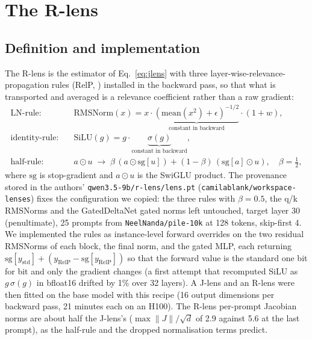 \documentclass[11pt]{article}
\begin{document}
\section{The R-lens}
\label{sec:rlens}
\subsection{Definition and implementation}
The R-lens \cite{blank2026rlens} is the estimator of Eq.~\eqref{eq:jlens} with three layer-wise-relevance-propagation rules (RelP, \cite{relp2025}) installed in the backward pass, so that what is transported and averaged is a relevance coefficient rather than a raw gradient:
\begin{align*}
\text{LN-rule:}&\quad \mathrm{RMSNorm}(x)=x\cdot\underbrace{(\mathrm{mean}(x^2)+\epsilon)^{-1/2}}_{\text{constant in backward}}\cdot(1+w),\\
\text{identity-rule:}&\quad \mathrm{SiLU}(g)=g\cdot\underbrace{\sigma(g)}_{\text{constant in backward}},\\
\text{half-rule:}&\quad a\odot u \;\to\; \beta\,(a\odot \mathrm{sg}[u]) + (1-\beta)\,(\mathrm{sg}[a]\odot u),\quad \beta=\tfrac12,
\end{align*}
where $\mathrm{sg}$ is stop-gradient and $a\odot u$ is the SwiGLU product. The provenance stored in the authors' \texttt{qwen3.5-9b/r-lens/lens.pt} (\texttt{camilablank/workspace-lenses}) fixes the configuration we copied: the three rules with $\beta=0.5$, the q/k RMSNorms and the GatedDeltaNet gated norms left untouched, target layer 30 (penultimate), 25 prompts from \texttt{NeelNanda/pile-10k} at 128 tokens, skip-first 4. We implemented the rules as instance-level forward overrides on the two residual RMSNorms of each block, the final norm, and the gated MLP, each returning $\mathrm{sg}[y_{\mathrm{std}}]+(y_{\mathrm{RelP}}-\mathrm{sg}[y_{\mathrm{RelP}}])$ so that the forward value is the standard one bit for bit and only the gradient changes (a first attempt that recomputed SiLU as $g\,\sigma(g)$ in bfloat16 drifted by 1\% over 32 layers). A J-lens and an R-lens were then fitted on the base model with this recipe (16 output dimensions per backward pass, 21 minutes each on an H100). The R-lens per-prompt Jacobian norms are about half the J-lens's ($\max\|J\|/\sqrt d$ of 2.9 against 5.6 at the last prompt), as the half-rule and the dropped normalisation terms predict.
\end{document}
